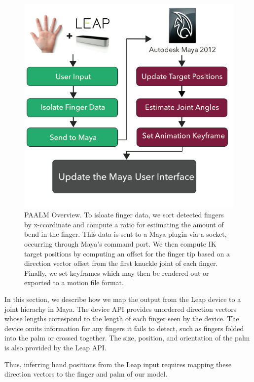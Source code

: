 \documentclass[review]{acmsiggraph}
\begin{document}
\begin{figure}
\centering
\includegraphics[scale=0.4]{Overview.png}
\vspace{-0.3cm}
\caption{PAALM Overview. To isloate finger data, we sort detected fingers by x-ccordinate and compute 
a ratio for estimating the amount of bend in the finger. This data is sent to a Maya plugin via a socket, 
occurring through Maya's command port. 
We then compute IK target positions by computing an offset for the finger tip based on a direction 
vector offset from the first knuckle joint of each finger. Finally, we set keyframes which may then be 
rendered out or exported to a motion file format.\label{HighLevel}}
\vspace{-0.5cm}
\end{figure}

In this section, we describe how we map the output from the Leap device to a joint hierachy 
in Maya.  The device API provides unordered direction vectors whose lengths 
correspond to the length of each finger seen by the device. The device omits information 
for any fingers it fails to detect, such as fingers folded into the palm or crossed together.
The size, position, and orientation of the palm is also provided by the Leap API. 

Thus, inferring hand positions from the Leap input requires mapping these direction 
vectors to the finger and palm of our model. 
\end{document}

